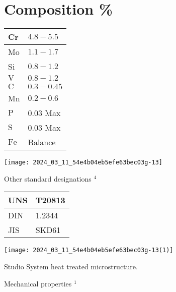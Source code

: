 \documentclass[10pt]{article}
\begin{document}
\section*{Composition \%}
\begin{center}
\begin{tabular}{ll}
Cr & $4.8-5.5$ \\
\hline
Mo & $1.1-1.7$ \\
\hline
Si & $0.8-1.2$ \\
\hline
$\mathrm{V}$ & $0.8-1.2$ \\
\hline
$\mathrm{C}$ & $0.3-0.45$ \\
\hline
Mn & $0.2-0.6$ \\
\hline
$\mathrm{P}$ & 0.03 Max \\
\hline
$\mathrm{S}$ & 0.03 Max \\
\hline
$\mathrm{Fe}$ & Balance \\
\hline
\end{tabular}
\end{center}

\begin{center}
\texttt{[image: 2024\_03\_11\_54e4b04eb5efe63bec03g-13]}
\end{center}

Other standard designations ${ }^{4}$

\begin{center}
\begin{tabular}{ll}
UNS & T20813 \\
\hline
DIN & 1.2344 \\
\hline
JIS & SKD61 \\
\hline
\end{tabular}
\end{center}

\begin{center}
\texttt{[image: 2024\_03\_11\_54e4b04eb5efe63bec03g-13(1)]}
\end{center}

Studio System heat treated microstructure.

Mechanical properties ${ }^{1}$
\end{document}
